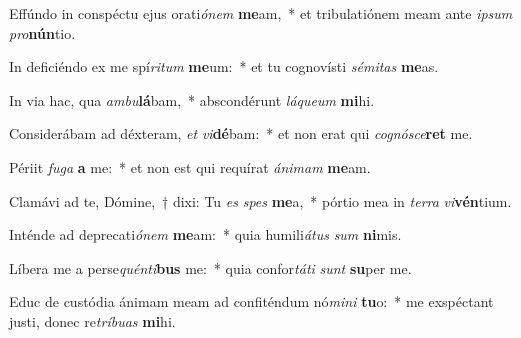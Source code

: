 \item Effúndo in conspéctu ejus orati\textit{ó}\textit{nem} \textbf{me}am,~* et tribulatiónem meam ante \textit{ip}\textit{sum} \textit{pro}\textbf{nún}tio.
\item In deficiéndo ex me spí\textit{ri}\textit{tum} \textbf{me}um:~* et tu cognovísti \textit{sé}\textit{mi}\textit{tas} \textbf{me}as.
\item In via hac, qua \textit{am}\textit{bu}\textbf{lá}bam,~* abscondérunt \textit{lá}\textit{que}\textit{um} \textbf{mi}hi.
\item Considerábam ad déxteram, \textit{et} \textit{vi}\textbf{dé}bam:~* et non erat qui \textit{co}\textit{gnó}\textit{sce}\textbf{ret} me.
\item Périit \textit{fu}\textit{ga} \textbf{a} me:~* et non est qui requírat \textit{á}\textit{ni}\textit{mam} \textbf{me}am.
\item Clamávi ad te, Dómine,~† dixi: Tu \textit{es} \textit{spes} \textbf{me}a,~* pórtio mea in \textit{ter}\textit{ra} \textit{vi}\textbf{vén}tium.
\item Inténde ad deprecati\textit{ó}\textit{nem} \textbf{me}am:~* quia humili\textit{á}\textit{tus} \textit{sum} \textbf{ni}mis.
\item Líbera me a perse\textit{quén}\textit{ti}\textbf{bus} me:~* quia confor\textit{tá}\textit{ti} \textit{sunt} \textbf{su}per me.
\item Educ de custódia ánimam meam ad confiténdum nó\textit{mi}\textit{ni} \textbf{tu}o:~* me exspéctant justi, donec re\textit{trí}\textit{bu}\textit{as} \textbf{mi}hi.
